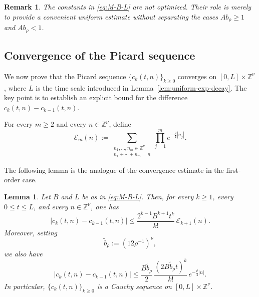 \documentclass[12pt,reqno,tbtags]{amsart}
\newtheorem{lemma}{Lemma}[section]
\newtheorem{remark}{Remark}[section]
\newcommand\1{\mathbbm{1}}
\begin{document}
\begin{remark}\label{rem:constants}
The constants in \eqref{eq:M-B-L} are not optimized. Their role is merely to provide
a convenient uniform estimate without separating the cases $Ab_{\rho}\geq 1$ and
$Ab_{\rho}<1$. 
\end{remark}

\subsection{Convergence of the Picard sequence}\label{sec:cauchy}

We now prove that the Picard sequence $\{c_k(t,n)\}_{k\geq 0}$ converges on
$[0,L]\times \mathbb{Z}^{\nu}$, where $L$ is the time scale introduced in
Lemma~\ref{lem:uniform-exp-decay}. The key point is to establish an explicit bound
for the difference $c_k(t,n)-c_{k-1}(t,n)$.

For every $m\geq 2$ and every $n\in \mathbb{Z}^{\nu}$, define
\begin{equation}\label{eq:Em-definition}
\mathcal{E}_m(n)
:=
\sum_{\substack{n_1,\dots,n_m\in \mathbb{Z}^{\nu}\\ n_1+\cdots+n_m=n}}
\prod_{j=1}^{m} e^{-\frac{\rho}{2}|n_j|}.
\end{equation}

The following lemma is the analogue of the convergence estimate in the first-order case.

\begin{lemma}\label{lem:cauchy-estimate}
Let $B$ and $L$ be as in \eqref{eq:M-B-L}. Then, for every $k\geq 1$, every
$0\leq t\leq L$, and every $n\in \mathbb{Z}^{\nu}$, one has
\begin{equation}\label{eq:cauchy-estimate-1}
|c_k(t,n)-c_{k-1}(t,n)|
\leq
\frac{2^{k-1}B^{k+1}t^k}{k!}\,\mathcal{E}_{k+1}(n).
\end{equation}
Moreover, setting
\begin{equation*}
\widetilde b_{\rho}:=(12\rho^{-1})^{\nu},
\end{equation*}
we also have
\begin{equation}\label{eq:cauchy-estimate-2}
|c_k(t,n)-c_{k-1}(t,n)|
\leq
\frac{B\widetilde b_{\rho}}{2}\,
\frac{(2B\widetilde b_{\rho}t)^k}{k!}\,
e^{-\frac{\rho}{4}|n|}.
\end{equation}
In particular, $\{c_k(t,n)\}_{k\geq 0}$ is a Cauchy sequence on
$[0,L]\times \mathbb{Z}^{\nu}$.
\end{lemma}
\end{document}
